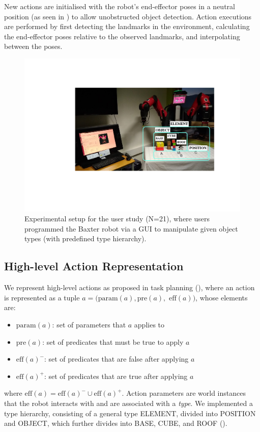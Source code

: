 New actions are initialised with the robot's end-effector poses in a neutral position (as seen in ) to allow unobstructed object detection.
Action executions are performed by first detecting the landmarks in the environment, calculating the end-effector poses relative to the observed landmarks, and interpolating between the poses.


\begin{figure}[h]
	\centering
	\includegraphics[width=0.7\linewidth]{figures/dispositif.pdf}
	\caption{Experimental setup for the user study (N=21), where users programmed the Baxter robot via a GUI to manipulate given object types (with predefined type hierarchy). }
	\label{fig:dispositif}
\end{figure}


\subsection{High-level Action Representation}
\label{sec:highlevel}
We represent high-level actions as proposed in task planning (), where an action is represented as a tuple $a = (\text{param}(a), \text{pre}(a),$ $\text{eff}(a))$, whose elements are:
\begin{itemize}
\item $\text{param}(a)$: set of parameters that $a$ applies to
\item $\text{pre}(a)$: set of predicates that must be true to apply $a$
\item $\text{eff}(a)^{-}$: set of predicates that are false after applying $a$
\item $\text{eff}(a)^{+}$: set of predicates that are true after applying $a$
\end{itemize}
where $\text{eff}(a) = \text{eff}(a)^{-} \cup \text{eff}(a)^{+}$. 
Action parameters are world instances that the robot interacts with and are associated with a \textit{type}.
We implemented a type hierarchy, consisting of a general type ELEMENT, divided into POSITION and OBJECT, which further divides into BASE, CUBE, and ROOF ().

